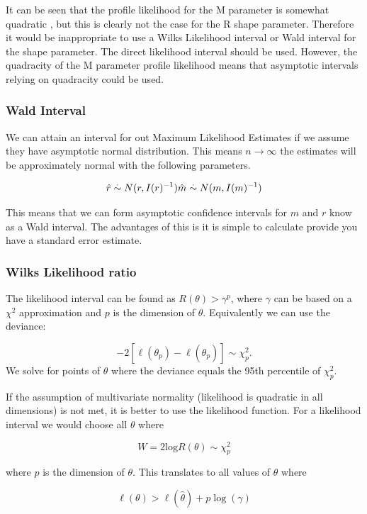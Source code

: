 \documentclass[11pt,preprint, authoryear]{elsarticle}
\numberwithin{equation}{section}
\numberwithin{figure}{section}
\numberwithin{table}{section}
\begin{document}
It can be seen that the profile likelihood for the M parameter is
somewhat quadratic , but this is clearly not the case for the R shape
parameter. Therefore it would be inappropriate to use a Wilks Likelihood
interval or Wald interval for the shape parameter. The direct likelihood
interval should be used. However, the quadracity of the M parameter
profile likelihood means that asymptotic intervals relying on quadracity
could be used.

\subsubsection{Wald Interval}\label{wald-interval}

We can attain an interval for out Maximum Likelihood Estimates if we
assume they have asymptotic normal distribution. This means
\(n\to\infty\) the estimates will be approximately normal with the
following parameters.

\[ \hat{r} \stackrel{.}{\sim} N(r,I(r)^{-1}) \\ 
\hat{m} \stackrel{.}{\sim} N(m,I(m)^{-1})\]

This means that we can form asymptotic confidence intervals for \(m\)
and \(r\) know as a Wald interval. The advantages of this is it is
simple to calculate provide you have a standard error estimate.

\subsubsection{Wilks Likelihood ratio}\label{wilks-likelihood-ratio}

The likelihood interval can be found as \(R(\theta) > \gamma^p\), where
\(\gamma\) can be based on a \(\chi^2\) approximation and \(p\) is the
dimension of \(\theta\). Equivalently we can use the deviance:

\[ -2[\ell(\theta_p) - \ell(\hat{\theta_p})] \sim \chi^2_p. \] We solve
for points of \(\theta\) where the deviance equals the 95th percentile
of \(\chi^2_p\).

If the assumption of multivariate normality (likelihood is quadratic in
all dimensions) is not met, it is better to use the likelihood function.
For a likelihood interval we would choose all \(\theta\) where

\[W = 2\text{log}R(\theta) \sim \chi^2_p\]

where \(p\) is the dimension of \(\theta\). This translates to all
values of \(\theta\) where

\[\ell(\theta) > \ell(\hat{\theta}) + p \log(\gamma)\]
\end{document}
